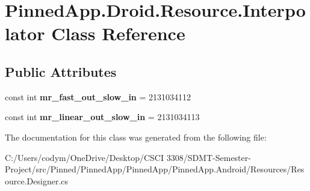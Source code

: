 \hypertarget{class_pinned_app_1_1_droid_1_1_resource_1_1_interpolator}{}\section{Pinned\+App.\+Droid.\+Resource.\+Interpolator Class Reference}
\label{class_pinned_app_1_1_droid_1_1_resource_1_1_interpolator}
\subsection*{Public Attributes}
\begin{DoxyCompactItemize}
\item 
\mbox{\label{class_pinned_app_1_1_droid_1_1_resource_1_1_interpolator_a2895c8e824e07692564a056a0f2a95f4}} 
const int {\bfseries mr\+\_\+fast\+\_\+out\+\_\+slow\+\_\+in} = 2131034112
\item 
\mbox{\label{class_pinned_app_1_1_droid_1_1_resource_1_1_interpolator_ac962de058bba685a163aaf54efa49dcd}} 
const int {\bfseries mr\+\_\+linear\+\_\+out\+\_\+slow\+\_\+in} = 2131034113
\end{DoxyCompactItemize}


The documentation for this class was generated from the following file\+:\begin{DoxyCompactItemize}
\item 
C\+:/\+Users/codym/\+One\+Drive/\+Desktop/\+C\+S\+C\+I 3308/\+S\+D\+M\+T-\/\+Semester-\/\+Project/src/\+Pinned/\+Pinned\+App/\+Pinned\+App/\+Pinned\+App.\+Android/\+Resources/Resource.\+Designer.\+cs\end{DoxyCompactItemize}
